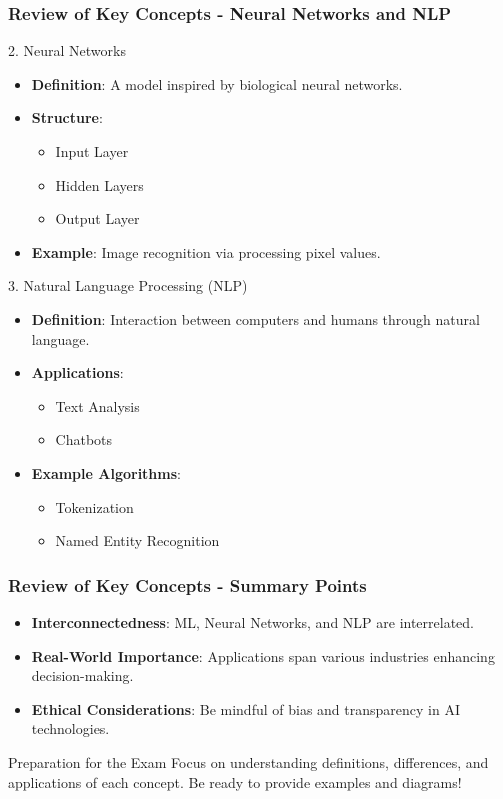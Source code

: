 \documentclass[aspectratio=169]{beamer}
\begin{document}
\begin{frame}[fragile]
  \frametitle{Review of Key Concepts - Neural Networks and NLP}
  \begin{block}{2. Neural Networks}
    \begin{itemize}
      \item \textbf{Definition}: A model inspired by biological neural networks.
      \item \textbf{Structure}:
      \begin{itemize}
        \item Input Layer
        \item Hidden Layers
        \item Output Layer
      \end{itemize}
      \item \textbf{Example}: Image recognition via processing pixel values.
    \end{itemize}
  \end{block}

  \begin{block}{3. Natural Language Processing (NLP)}
    \begin{itemize}
      \item \textbf{Definition}: Interaction between computers and humans through natural language.
      \item \textbf{Applications}:
      \begin{itemize}
        \item Text Analysis
        \item Chatbots
      \end{itemize}
      \item \textbf{Example Algorithms}:
      \begin{itemize}
        \item Tokenization
        \item Named Entity Recognition
      \end{itemize}
    \end{itemize}
  \end{block}
\end{frame}

\begin{frame}[fragile]
  \frametitle{Review of Key Concepts - Summary Points}
  \begin{itemize}
    \item \textbf{Interconnectedness}: ML, Neural Networks, and NLP are interrelated.
    \item \textbf{Real-World Importance}: Applications span various industries enhancing decision-making.
    \item \textbf{Ethical Considerations}: Be mindful of bias and transparency in AI technologies.
  \end{itemize}
  
  \begin{block}{Preparation for the Exam}
    Focus on understanding definitions, differences, and applications of each concept. Be ready to provide examples and diagrams!
  \end{block}
\end{frame}
\end{document}
